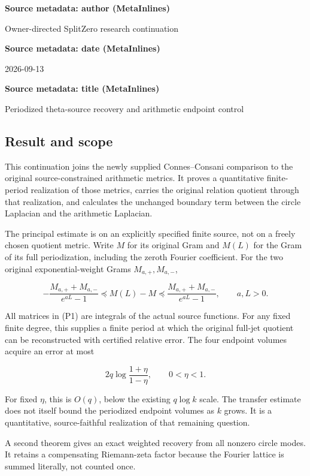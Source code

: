 \textbf{Source metadata: author (MetaInlines)}

Owner-directed SplitZero research continuation

\textbf{Source metadata: date (MetaInlines)}

2026-09-13

\textbf{Source metadata: title (MetaInlines)}

Periodized theta-source recovery and arithmetic endpoint control

\subsection{Result and scope}\label{endpoint-periodized_original--result-and-scope}

This continuation joins the newly supplied Connes--Consani comparison to the original source-constrained arithmetic metrics. It proves a quantitative finite-period realization of those metrics, carries the original relation quotient through that realization, and calculates the unchanged boundary term between the circle Laplacian and the arithmetic Laplacian.

The principal estimate is on an explicitly specified finite source, not on a freely chosen quotient metric. Write \(M\) for its original Gram and \(M(L)\) for the Gram of its full periodization, including the zeroth Fourier coefficient. For the two original exponential-weight Grams \(M_{a,+},M_{a,-}\),

\[
-\frac{M_{a,+}+M_{a,-}}{e^{aL}-1}
\preceq M(L)-M
\preceq\frac{M_{a,+}+M_{a,-}}{e^{aL}-1},\qquad a,L>0. \tag{P1}
\]

All matrices in (P1) are integrals of the actual source functions. For any fixed finite degree, this supplies a finite period at which the original full-jet quotient can be reconstructed with certified relative error. The four endpoint volumes acquire an error at most

\[
2q\log\frac{1+\eta}{1-\eta},\qquad 0<\eta<1. \tag{P2}
\]

For fixed \(\eta\), this is \(O(q)\), below the existing \(q\log k\) scale. The transfer estimate does not itself bound the periodized endpoint volumes as \(k\) grows. It is a quantitative, source-faithful realization of that remaining question.

A second theorem gives an exact weighted recovery from all nonzero circle modes. It retains a compensating Riemann-zeta factor because the Fourier lattice is summed literally, not counted once.

